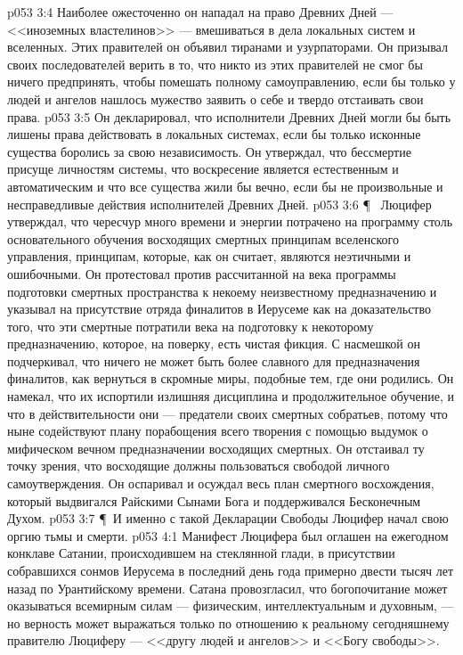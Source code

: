 \vs p053 3:4 Наиболее ожесточенно он нападал на право Древних Дней --- <<иноземных властелинов>> --- вмешиваться в дела локальных систем и вселенных. Этих правителей он объявил тиранами и узурпаторами. Он призывал своих последователей верить в то, что никто из этих правителей не смог бы ничего предпринять, чтобы помешать полному самоуправлению, если бы только у людей и ангелов нашлось мужество заявить о себе и твердо отстаивать свои права.
\vs p053 3:5 Он декларировал, что исполнители Древних Дней могли бы быть лишены права действовать в локальных системах, если бы только исконные существа боролись за свою независимость. Он утверждал, что бессмертие присуще личностям системы, что воскресение является естественным и автоматическим и что все существа жили бы вечно, если бы не произвольные и несправедливые действия исполнителей Древних Дней.
\vs p053 3:6 \P\ \bibnobreakspace {} Люцифер утверждал, что чересчур много времени и энергии потрачено на программу столь основательного обучения восходящих смертных принципам вселенского управления, принципам, которые, как он считает, являются неэтичными и ошибочными. Он протестовал против рассчитанной на века программы подготовки смертных пространства к некоему неизвестному предназначению и указывал на присутствие отряда финалитов в Иерусеме как на доказательство того, что эти смертные потратили века на подготовку к некоторому предназначению, которое, на поверку, есть чистая фикция. С насмешкой он подчеркивал, что ничего не может быть более славного для предназначения финалитов, как вернуться в скромные миры, подобные тем, где они родились. Он намекал, что их испортили излишняя дисциплина и продолжительное обучение, и что в действительности они --- предатели своих смертных собратьев, потому что ныне содействуют плану порабощения всего творения с помощью выдумок о мифическом вечном предназначении восходящих смертных. Он отстаивал ту точку зрения, что восходящие должны пользоваться свободой личного самоутверждения. Он оспаривал и осуждал весь план смертного восхождения, который выдвигался Райскими Сынами Бога и поддерживался Бесконечным Духом.
\vs p053 3:7 \P\ И именно с такой Декларации Свободы Люцифер начал свою оргию тьмы и смерти.
\vs p053 4:1 Манифест Люцифера был оглашен на ежегодном конклаве Сатании, происходившем на стеклянной глади, в присутствии собравшихся сонмов Иерусема в последний день года примерно двести тысяч лет назад по Урантийскому времени. Сатана провозгласил, что богопочитание может оказываться всемирным силам --- физическим, интеллектуальным и духовным, --- но верность может выражаться только по отношению к реальному сегодняшнему правителю Люциферу --- <<другу людей и ангелов>> и <<Богу свободы>>.
